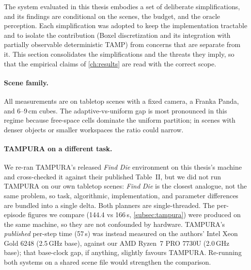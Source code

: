 The system evaluated in this thesis embodies a set of deliberate
simplifications, and its findings are conditional on the scenes, the
budget, and the oracle perception. Each simplification was adopted to
keep the implementation tractable and to isolate the contribution (Boxel
discretization and its integration with partially observable
deterministic TAMP) from concerns that are separate from it. This
section consolidates the simplifications and the threats they imply, so
that the empirical claims of \cref{ch:results} are read with the correct
scope.

\paragraph{Scene family.} All measurements are on tabletop scenes with a
fixed camera, a Franka Panda, and 6--9\,cm cubes. The
adaptive-vs-uniform gap is most pronounced in this regime because
free-space cells dominate the uniform partition; in scenes with denser
objects or smaller workspaces the ratio could narrow.

\paragraph{TAMPURA on a different task.} We re-ran TAMPURA's released
\emph{Find Die} environment on this thesis's machine and cross-checked it
against their published Table~II, but we did not run TAMPURA on our own
tabletop scenes: \emph{Find Die} is the closest analogue, not the same
problem, so task, algorithmic, implementation, and parameter differences
are bundled into a single delta. Both planners are single-threaded. The per-episode figures we compare
(144.4 vs 166\,s, \cref{subsec:tampura}) were produced on the same machine, so
they are not confounded by hardware. TAMPURA's \emph{published} per-step time
(57\,s) was instead measured on the authors' Intel Xeon Gold 6248 (2.5\,GHz
base), against our AMD Ryzen~7 PRO 7730U (2.0\,GHz base); that base-clock gap,
if anything, slightly favours TAMPURA.
Re-running both systems on a shared scene file would strengthen the
comparison.

